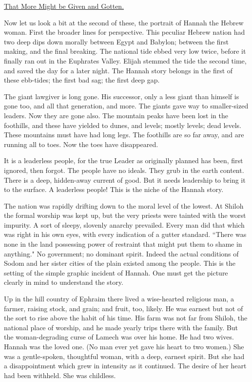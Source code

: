 \underline{That More Might be Given and Gotten.}


Now let us look a bit at the second of these, the portrait of Hannah the
Hebrew woman. First the broader lines for perspective. This peculiar
Hebrew nation had two deep dips down morally between Egypt and Babylon;
between the first making, and the final breaking. The national tide ebbed
very low twice, before it finally ran out in the Euphrates Valley. Elijah
stemmed the tide the second time, and saved the day for a later night. The
Hannah story belongs in the first of these ebb-tides; the first bad sag;
the first deep gap.

The giant lawgiver is long gone. His successor, only a less giant than
himself is gone too, and all that generation, and more. The giants gave
way to smaller-sized leaders. Now they are gone also. The mountain peaks
have been lost in the foothills, and these have yielded to dunes, and
levels; mostly levels; dead levels. These mountains must have had long
legs. The foothills are so far away, and are running all to toes. Now the
toes have disappeared.

It is a leaderless people, for the true Leader as originally planned has
been, first ignored, then forgot. The people have no ideals. They grub in
the earth content. There is a deep, hidden-away current of good. But it
needs leadership to bring it to the surface. A leaderless people! This is
the niche of the Hannah story.

The nation was rapidly drifting down to the moral level of the lowest. At
Shiloh the formal worship was kept up, but the very priests were tainted
with the worst impurity. A sort of sleepy, slovenly anarchy prevailed.
Every man did that which was right in his own eyes, with every indication
of a gutter standard. ``There was none in the land possessing power of
restraint that might put them to shame in anything." No government; no
dominant spirit. Indeed the actual conditions of Sodom and her sister
cities of the plain existed among the people. This is the setting of the
simple graphic incident of Hannah. One must get the picture clearly in
mind to understand the story.

Up in the hill country of Ephraim there lived a wise-hearted religious
man, a farmer, raising stock, and grain; and fruit, too, likely. He was
earnest but not of the sort to rise above the habit of his time. His farm
was not far from Shiloh, the national place of worship, and he made yearly
trips there with the family. But the woman-degrading curse of Lamech was
over his home. He had two wives. Hannah was the loved one. (No man ever
yet gave his heart to two women.) She was a gentle-spoken, thoughtful
woman, with a deep, earnest spirit. But she had a disappointment which
grew in intensity as it continued. The desire of her heart had been
withheld. She was childless.

